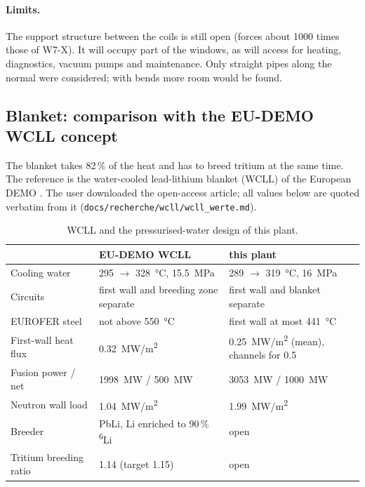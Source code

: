 \documentclass[10pt,a4paper]{article}
\begin{document}
\paragraph{Limits.} The support structure between the coils is still open (forces about 1000 times those of W7-X).
It will occupy part of the windows, as will access for heating, diagnostics, vacuum pumps and maintenance. Only
straight pipes along the normal were considered; with bends more room would be found.

\subsection{Blanket: comparison with the EU-DEMO WCLL concept}
The blanket takes 82\,\% of the heat and has to breed tritium at the same time. The reference is the
water-cooled lead-lithium blanket (WCLL) of the European DEMO \cite{arena2023}. The user downloaded the
open-access article; all values below are quoted verbatim from it (\texttt{docs/recherche/wcll/wcll\_werte.md}).
\begin{table}[H]\centering\small
\begin{tabular}{lll}\toprule
 & EU-DEMO WCLL \cite{arena2023} & this plant\\\midrule
Cooling water & \SI{295}{} $\rightarrow$ \SI{328}{\celsius}, \SI{15.5}{MPa} & \SI{289}{} $\rightarrow$ \SI{319}{\celsius}, \SI{16}{MPa}\\
Circuits & first wall and breeding zone separate & first wall and blanket separate\\
EUROFER steel & not above \SI{550}{\celsius} & first wall at most \SI{441}{\celsius}\\
First-wall heat flux & \SI{0.32}{MW/m^2} & \SI{0.25}{MW/m^2} (mean), channels for \SI{0.5}{}\\
Fusion power / net & \SI{1998}{MW} / \SI{500}{MW} & \SI{3053}{MW} / \SI{1000}{MW}\\
Neutron wall load & \SI{1.04}{MW/m^2} & \SI{1.99}{MW/m^2}\\
Breeder & PbLi, Li enriched to 90\,\% \textsuperscript{6}Li & open\\
Tritium breeding ratio & 1.14 (target 1.15) & open\\\bottomrule
\end{tabular}\caption{WCLL and the pressurised-water design of this plant.}\end{table}
\end{document}
